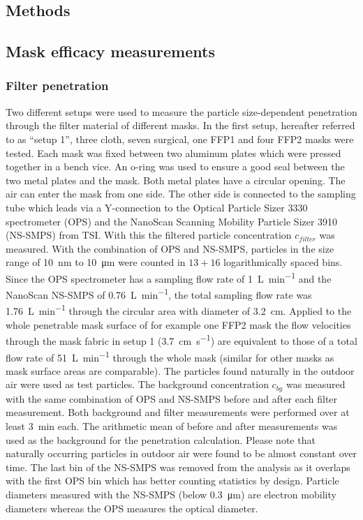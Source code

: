 \documentclass[preprint]{elsarticle}
\begin{document}
\subsection{Methods}
\subsection{Mask efficacy measurements}
\label{sec: mask_efficacy}
\subsubsection{Filter penetration}
\label{sec:penetration_methods}
Two different setups were used to measure the particle size-dependent penetration through the filter material of different masks. In the first setup, hereafter referred to as \enquote{setup 1}, three cloth, seven surgical, one FFP1 and four FFP2 masks were tested. Each mask was fixed between two aluminum plates which were pressed together in a bench vice. An o-ring was used to ensure a good seal between the two metal plates and the mask.
Both metal plates have a circular opening. The air can enter the mask from one side. The other side is connected to the sampling tube which leads via a Y-connection to the Optical Particle Sizer 3330 spectrometer (OPS) and the NanoScan Scanning Mobility Particle Sizer 3910 (NS-SMPS) from TSI. With this 
the filtered particle concentration $c_{filter}$ was measured. With the combination of OPS and NS-SMPS, particles in the size range of \SI{10}{\nano \meter} to \SI{10}{\micro \meter} were counted in $13+16$ logarithmically spaced bins. Since the OPS spectrometer has a sampling flow rate of \SI{1}{\liter\per\minute} and the NanoScan NS-SMPS of \SI{0.76}{\liter \per \minute}, the total sampling flow rate was \SI{1.76}{\liter\per\minute} through the circular area with diameter of \SI{3.2}{\centi\meter}. Applied to the whole penetrable mask surface of for example one FFP2 mask the flow velocities through the mask fabric in setup 1 (\SI{3.7}{\centi \meter \per \second}) are equivalent to those of a total flow rate of \SI{51}{\liter\per\minute} through the whole mask (similar for other masks as mask surface areas are comparable). The particles found naturally in the outdoor air were used as test particles. The background concentration $c_{bg}$ was measured with the same combination of OPS and NS-SMPS before and after each filter measurement. Both background and filter measurements were performed over at least \SI{3}{\minute} each. The arithmetic mean of before  and after measurements was used as the background for the penetration calculation. Please note that  naturally occurring particles in outdoor air were found to be almost  constant over time.
The last bin of the NS-SMPS was removed from the analysis as it overlaps with the first OPS bin which has better counting statistics by design. Particle diameters measured with the NS-SMPS (below \SI{0.3}{\micro \meter}) are electron mobility diameters whereas the OPS measures the optical diameter.
\end{document}
